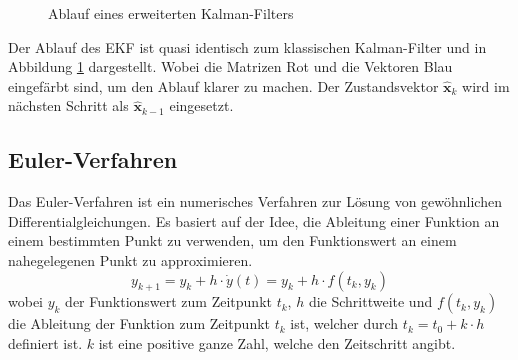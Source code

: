 \begin{figure}
\caption{Ablauf eines erweiterten Kalman-Filters}
\label{fig:ekf}

\end{figure}
Der Ablauf des EKF ist quasi identisch zum klassischen Kalman-Filter und in Abbildung \ref{fig:ekf} dargestellt. Wobei die Matrizen Rot und die Vektoren Blau eingefärbt sind, um den Ablauf klarer zu machen. Der Zustandsvektor $\hat{\mathbf{x}}_{k}$ wird im nächsten Schritt als $\hat{\mathbf{x}}_{k-1}$ eingesetzt.
\parencite{RibeiroKalman}\parencite{ExtendedKalmanPhils1}
\subsection{Euler-Verfahren}
\label{subsec:ekf_euler_verfahren}
Das Euler-Verfahren ist ein numerisches Verfahren zur Lösung von gewöhnlichen Differentialgleichungen. Es basiert auf der Idee, die Ableitung einer Funktion an einem bestimmten Punkt zu verwenden, um den Funktionswert an einem nahegelegenen Punkt zu approximieren. 
\begin{equation}
    y_{k+1} = y_k + h \cdot \dot{y}(t)= y_k + h \cdot f(t_k, y_k)
\end{equation}
wobei $y_k$ der Funktionswert zum Zeitpunkt $t_k$, $h$ die Schrittweite und $f(t_k, y_k)$ die Ableitung der Funktion zum Zeitpunkt $t_k$ ist, welcher durch $t_{k} = t_0 + k \cdot h$ definiert ist. $k$ ist eine positive ganze Zahl, welche den Zeitschritt angibt.
\\

